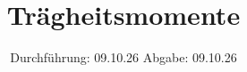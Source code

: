 


\subject{v101}
\title{Trägheitsmomente}
\date{%
  Durchführung: 09.10.26
  \hspace{3em}
  Abgabe: 09.10.26}



\maketitle
\thispagestyle{empty}
\tableofcontents
\newpage






\printbibliography{}





